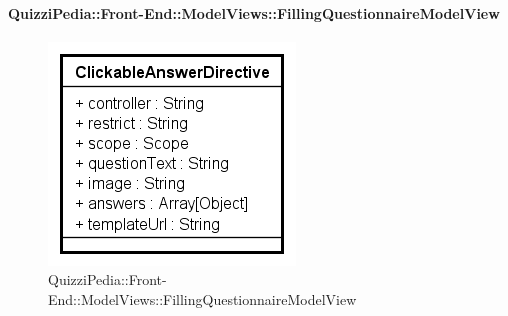 	\paragraph{QuizziPedia::Front-End::ModelViews::FillingQuestionnaireModelView}
	
	\label{QuizziPedia::Front-End::ModelViews::FillingQuestionnaireModelView}
	
	\begin{figure}[ht]
		\centering
		\includegraphics[scale=0.5,keepaspectratio]{UML/Classi/Front-End/QuizziPedia_Front-end_Templates_ClickableAnswerTemplate.png}
		\caption{QuizziPedia::Front-End::ModelViews::FillingQuestionnaireModelView}
	\end{figure} \FloatBarrier
	
